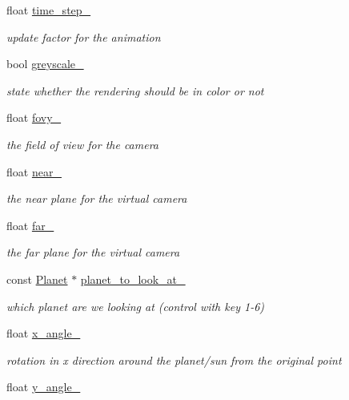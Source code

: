 \begin{DoxyCompactItemize}
float \hyperlink{classSolar__viewer_ad2ff1703788f0c694bd8e6e8be5c3be5}{time\+\_\+step\+\_\+}
\begin{DoxyCompactList}\small\item\em update factor for the animation \end{DoxyCompactList}\item 
bool \hyperlink{classSolar__viewer_ad0da37e7839ea05cd500c59eacfc04cb}{greyscale\+\_\+}
\begin{DoxyCompactList}\small\item\em state whether the rendering should be in color or not \end{DoxyCompactList}\item 
float \hyperlink{classSolar__viewer_a0ee3e25d0a16f5f8f2be784b42a3b576}{fovy\+\_\+}
\begin{DoxyCompactList}\small\item\em the field of view for the camera \end{DoxyCompactList}\item 
float \hyperlink{classSolar__viewer_a58e1539134e5eb23ee851565ae8724f1}{near\+\_\+}
\begin{DoxyCompactList}\small\item\em the near plane for the virtual camera \end{DoxyCompactList}\item 
float \hyperlink{classSolar__viewer_ae47e94d8d1b6ee4297454d6234531d87}{far\+\_\+}
\begin{DoxyCompactList}\small\item\em the far plane for the virtual camera \end{DoxyCompactList}\item 
const \hyperlink{classPlanet}{Planet} $\ast$ \hyperlink{classSolar__viewer_af0b149d27213a8b45e5672c2e1d5b53a}{planet\+\_\+to\+\_\+look\+\_\+at\+\_\+}
\begin{DoxyCompactList}\small\item\em which planet are we looking at (control with key 1-\/6) \end{DoxyCompactList}\item 
float \hyperlink{classSolar__viewer_afe0f50221ea1464e4b1a9c79071bcac0}{x\+\_\+angle\+\_\+}
\begin{DoxyCompactList}\small\item\em rotation in x direction around the planet/sun from the original point \end{DoxyCompactList}\item 
float \hyperlink{classSolar__viewer_aec80e0da0a52b108b1b7223d2a974860}{y\+\_\+angle\+\_\+}

\end{DoxyCompactItemize}
